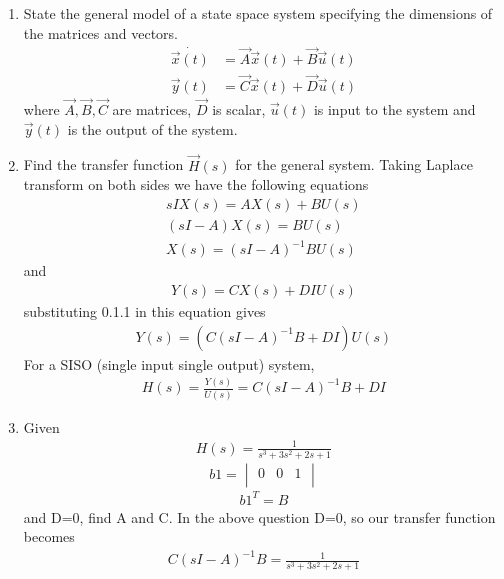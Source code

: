\begin{enumerate}[label=\thesection.\arabic*.,ref=\thesection.\theenumi]
\item State the general model of a state space system specifying the dimensions of the matrices and vectors.
\\
\solution 
\begin{align}
\dot{\vec{x}(t)}&=\vec{A}\vec{x}(t)+\vec{B}\vec{u}(t) \\
 \vec{y}(t)&=\vec{C}\vec{x}(t)+\vec{D} \vec{u}(t)
\end{align}
where $\vec{A},\vec{B},\vec{C}$ are matrices, $\vec{D}$ is scalar, $\vec{u}(t)$ is input to the system and$ \vec{y}(t)$ is the output of the system.
\item Find the transfer function $\vec{H}(s)$ for the general system.
Taking Laplace transform on both sides we have the following equations
\begin{align}
sIX(s)= AX(s)+ BU(s)\\
(sI-A)X(s)= BU(s)\\
X(s)={(sI-A)^{-1}}B U(s)
\end{align}
and
\begin{align}
Y(s)= CX(s)+DIU(s)
\end{align}
substituting 0.1.1 in this equation gives
\begin{align}
Y(s)=( C{(sI-A)^{-1}}B+DI) U(s)
\end{align}
%
For a SISO (single input single output) system, 
\begin{align}
H(s)= {\frac{Y(s)}{U(s)}}= C{(sI-A)^{-1}}B+DI
\end{align}

\item Given 
\begin{align}
H(s)=\frac{1}{s^3+3s^2+2s+1}
\end{align}
\begin{equation}
 b1 =\begin{vmatrix}
  0&0&1\\
 \end{vmatrix}
\end{equation}
\begin{align}
b1^T=B
\end{align}
and D=0, find A and C.
\solution
In the above question D=0, so our transfer function becomes
\begin{align}
C{(sI-A)^{-1}}B=\frac{1}{s^3 + 3s^2+2s + 1}
\end{align}


\end{enumerate}
